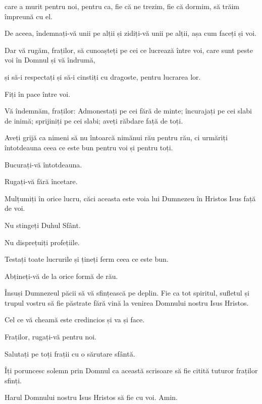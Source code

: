 {care a murit pentru noi, pentru ca, fie că ne trezim, fie că dormim, să trăim împreună cu el.

De aceea, îndemnați-vă unii pe alții și zidiți-vă unii pe alții, așa cum faceți și voi.


\par }{\PP {}Dar vă rugăm, fraților, să cunoașteți pe cei ce lucrează între voi, care sunt peste voi în Domnul și vă îndrumă,

și să-i respectați și să-i cinstiți cu dragoste, pentru lucrarea lor.

\par }{\PP Fiți în pace între voi.

Vă îndemnăm, fraților: Admonestați pe cei fără de minte; încurajați pe cei slabi de inimă; sprijiniți pe cei slabi; aveți răbdare față de toți.

Aveți grijă ca nimeni să nu întoarcă nimănui rău pentru rău, ci urmăriți întotdeauna ceea ce este bun pentru voi și pentru toți.


\par }{\PP {}Bucurați-vă întotdeauna.

Rugați-vă fără încetare.

Mulțumiți în orice lucru, căci aceasta este voia lui Dumnezeu în Hristos Isus față de voi.

Nu stingeți Duhul Sfânt.

Nu disprețuiți profețiile.

Testați toate lucrurile și țineți ferm ceea ce este bun.

Abțineți-vă de la orice formă de rău.


\par }{\PP {}Însuși Dumnezeul păcii să vă sfințească pe deplin. Fie ca tot spiritul, sufletul și trupul vostru să fie păstrate fără vină la venirea Domnului nostru Isus Hristos.


\par }{\PP {}Cel ce vă cheamă este credincios și va și face.


\par }{\PP {}Fraților, rugați-vă pentru noi.


\par }{\PP {}Salutați pe toți frații cu o sărutare sfântă.

Îți poruncesc solemn prin Domnul ca această scrisoare să fie citită tuturor fraților sfinți.


\par }{\PP {}Harul Domnului nostru Isus Hristos să fie cu voi. Amin.


\par }
